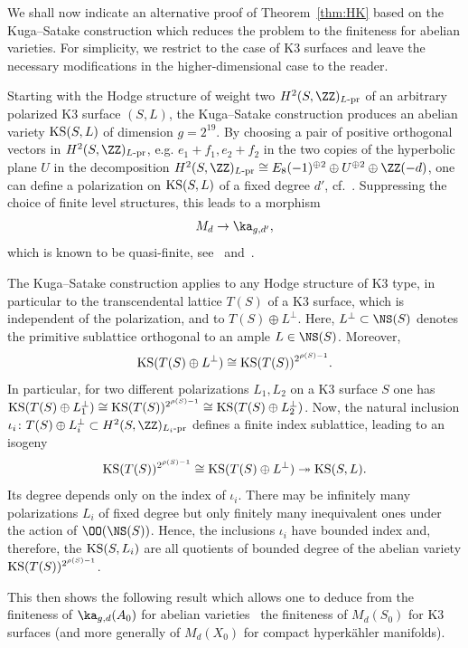 \medskip

We shall now indicate an alternative proof of Theorem~\ref{thm:HK} based on the Kuga--Satake construction which reduces the problem to the finiteness for abelian varieties. For simplicity, we restrict to the case of K3 surfaces and leave the necessary modifications in the higher-dimensional case to the reader.

Starting with the Hodge structure of weight two $H^2(S,\ZZ)_{L\text{-pr}}$ of an arbitrary polarized K3 surface $(S,L)$, the Kuga--Satake construction produces an abelian variety ${\rm KS}(S,L)$ of dimension $g=2^{19}$. By choosing a pair of positive orthogonal vectors in $H^2(S,\ZZ)_{L\text{-pr}}$, e.g. $e_1+f_1, e_2+f_2$ in the two copies of the hyperbolic plane $U$ in the decomposition $ H^2(S,\ZZ)_{L\text{-pr}}\cong E_8(-1)^{\oplus 2}\oplus U^{\oplus 2}\oplus\ZZ(-d)$, one can define a polarization on ${\rm KS}(S,L)$ of a fixed degree $d'$, cf.~\cite[Chapter~4]{HuyK3}. Suppressing the choice of finite level structures, this leads to a morphism
\begin{equation}\label{eqn:KS}
M_d\to \ka_{g,d'},
\end{equation}
which is known to be quasi-finite, see~\cite{Andre,Rizov} and~\cite[Proposition~5.10]{Maulik}.

The Kuga--Satake construction applies to any Hodge structure of K3 type, in particular to the transcendental lattice $T(S)$ of a K3 surface, which is independent of the polarization, and to $T(S)\oplus L^\perp$. Here, $L^\perp\subset\NS(S)$ denotes the primitive sublattice
orthogonal to an ample $L\in \NS(S)$. Moreover,
\[
{\rm KS}(T(S)\oplus L^\perp)\cong {\rm KS}(T(S))^{2^{\rho(S)-1}}.
\]
In particular, for two different polarizations $L_1,L_2$ on a K3 surface $S$ one has ${\rm KS}(T(S)\oplus L_1^\perp)\cong {\rm KS}(T(S))^{2^{\rho(S)-1}}\cong{\rm KS}(T(S)\oplus L_2^\perp)$.
Now, the natural inclusion $\iota_i\colon T(S)\oplus L_i^\perp\subset H^2(S,\ZZ)_{L_i\text{-pr}}$ defines a finite index sublattice, leading to an isogeny
\[
{\rm KS}(T(S))^{2^{\rho(S)-1}}\cong{\rm KS}(T(S)\oplus L^\perp)\twoheadrightarrow {\rm KS}(S,L).
\]
Its degree depends only
on the index of $\iota_i$. There may be infinitely many polarizations $L_i$ of fixed degree but only finitely many inequivalent ones under the action of $\OO(\NS(S))$. Hence, the inclusions $\iota_i$ have bounded index and, therefore, the ${\rm KS}(S,L_i)$ are all quotients of bounded degree of the abelian variety ${\rm KS}(T(S))^{2^{\rho(S)-1}}$.

This then shows the following result which allows one to deduce from the finiteness of $\ka_{g,d}(A_0)$ for abelian varieties~\cite{NarNor,Milne} the finiteness of $M_d(S_0)$ for K3 surfaces (and more generally of $M_d(X_0)$ for compact hyperk\"ahler manifolds).

